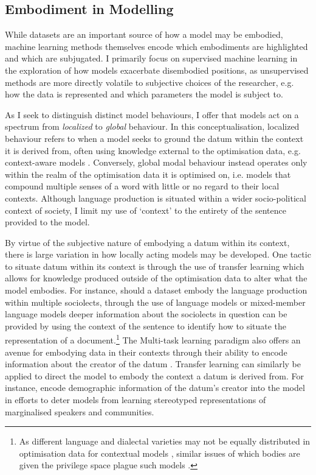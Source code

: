 \subsection{Embodiment in Modelling}\label{sec:model_embodiments}
While datasets are an important source of how a model may be embodied, machine learning methods themselves encode which embodiments are highlighted and which are subjugated.
I primarily focus on supervised machine learning in the exploration of how models exacerbate disembodied positions, as unsupervised methods are more directly volatile to subjective choices of the researcher, e.g. how the data is represented and which parameters the model is subject to.

As I seek to distinguish distinct model behaviours, I offer that models act on a spectrum from \textit{localized} to \textit{global} behaviour.
In this conceptualisation, localized behaviour refers to when a model seeks to ground the datum within the context it is derived from, often using knowledge external to the optimisation data, e.g. context-aware models \citep{Garcia:2019,Devlin:2019}.
Conversely, global modal behaviour instead operates only within the realm of the optimisation data it is optimised on, i.e. models that compound multiple senses of a word with little or no regard to their local contexts.
Although language production is situated within a wider socio-political context of society, I limit my use of `context' to the entirety of the sentence provided to the model.

By virtue of the subjective nature of embodying a datum within its context, there is large variation in how locally acting models may be developed.
One tactic to situate datum within its context is through the use of transfer learning which allows for knowledge produced outside of the optimisation data to alter what the model embodies.
For instance, should a dataset embody the language production within multiple sociolects, through the use of  language models \citep{Devlin:2019} or mixed-member language models \citep{Blodgett:2016} deeper information about the sociolects in question can be provided by using the context of the sentence to identify how to situate the representation of a document.\footnote{As different language and dialectal varieties may not be equally distributed in optimisation data for contextual models \citep{Dunn:2020}, similar issues of which bodies are given the privilege space plague such models \citep{Tan-Celis:2019}.}
The Multi-task learning paradigm also offers an avenue for embodying data in their contexts through their ability to encode information about the creator of the datum \citep{Benton:2017,Garcia:2019}.
Transfer learning can similarly be applied to direct the model to embody the context a datum is derived from.
For instance, \citet{Romanov:2019} encode demographic information of the datum's creator into the model in efforts to deter models from learning stereotyped representations of marginalised speakers and communities.

